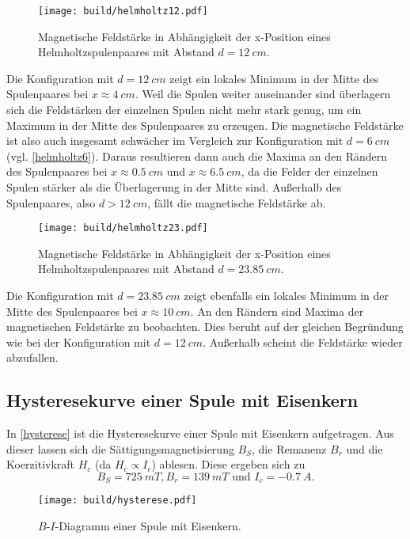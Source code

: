 \begin{figure}[H]
    \texttt{[image: build/helmholtz12.pdf]}
    \caption{Magnetische Feldstärke in Abhängigkeit der x-Position eines Helmholtzspulenpaares mit Abstand $d =\SI{12}{cm}$.}
    \label{helmholtz12}
\end{figure}
Die Konfiguration mit $d = \SI{12}{cm}$ zeigt ein lokales Minimum in der Mitte des Spulenpaares bei $x \approx \SI{4}{cm}$. Weil die Spulen weiter auseinander sind
überlagern sich die Feldstärken der einzelnen Spulen nicht mehr stark genug, um ein Maximum in der Mitte des Spulenpaares zu erzeugen. Die magnetische Feldstärke ist also auch insgesamt schwächer im Vergleich zur Konfiguration mit $d = \SI{6}{cm}$ (vgl. \autoref{helmholtz6}).
Daraus resultieren dann auch die Maxima an den Rändern des Spulenpaares bei $x \approx \SI{0.5}{cm}$ und $x \approx \SI{6.5}{cm}$, da die Felder der einzelnen Spulen stärker als die Überlagerung in der Mitte sind. Außerhalb des Spulenpaares, also $d > \SI{12}{cm}$, fällt die 
magnetische Feldstärke ab.

\begin{figure}[H]
    \texttt{[image: build/helmholtz23.pdf]}
    \caption{Magnetische Feldstärke in Abhängigkeit der x-Position eines Helmholtzspulenpaares mit Abstand $d =\SI{23.85}{cm}$.}
    \label{helmholtz23}
\end{figure}
Die Konfiguration mit $d = \SI{23.85}{cm}$ zeigt ebenfalls ein lokales Minimum in der Mitte des Spulenpaares bei $x \approx \SI{10}{cm}$. An den Rändern sind Maxima der magnetischen Feldstärke zu beobachten.
Dies beruht auf der gleichen Begründung wie bei der Konfiguration mit $d =\SI{12}{cm}$. Außerhalb scheint die Feldstärke wieder abzufallen.

\newpage
\subsection{Hysteresekurve einer Spule mit Eisenkern}
In \autoref{hysterese} ist die Hysteresekurve einer Spule mit Eisenkern aufgetragen. Aus dieser lassen sich die Sättigungsmagnetisierung $B_S$, die Remanenz $B_r$ und
die Koerzitivkraft $H_c$ (da $H_c \propto I_c$) ablesen. Diese ergeben sich zu 
\begin{equation*}
    B_S = \SI{725}{mT}, B_r = \SI{139}{mT} \text{ und } I_c = \SI{-0.7}{A}.
\end{equation*}


\begin{figure}[H]
    \texttt{[image: build/hysterese.pdf]}
    \caption{$B$-$I$-Diagramm einer Spule mit Eisenkern.}
    \label{hysterese}
\end{figure}













\newpage